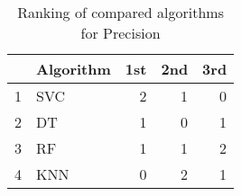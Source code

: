 \begin{table}
\footnotesize
\caption{Ranking of compared algorithms for Precision}
\label{tab:places Precision}
\begin{tabular}{llrrr}
\hline
 & Algorithm & 1st & 2nd & 3rd \\
\hline
1 & SVC & 2 & 1 & 0 \\
2 & DT & 1 & 0 & 1 \\
3 & RF & 1 & 1 & 2 \\
4 & KNN & 0 & 2 & 1 \\
\hline
\end{tabular}
\end{table}
